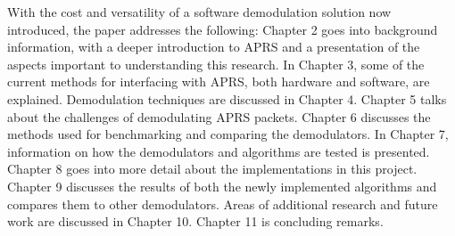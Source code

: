 With the cost and versatility of a software demodulation solution now introduced, the paper addresses the following: Chapter 2 goes into background information, with a deeper introduction to APRS and a presentation of the aspects important to understanding this research. In Chapter 3, some of the current methods for interfacing with APRS, both hardware and software, are explained. Demodulation techniques are discussed in Chapter 4. Chapter 5 talks about the challenges of demodulating APRS packets. Chapter 6 discusses the methods used for benchmarking and comparing the demodulators. In Chapter 7, information on how the demodulators and algorithms are tested is presented. Chapter 8 goes into more detail about the implementations in this project. Chapter 9 discusses the results of both the newly implemented algorithms and compares them to other demodulators. Areas of additional research and future work are discussed in Chapter 10. Chapter 11 is concluding remarks.
